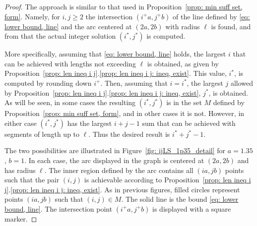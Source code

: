 \documentclass[12pt, a4paper]{article}
\newcommand{\len}{\ell} %
\newcommand{\isolr}{i^+}
\newcommand{\jsolr}{j^+}
\newcommand{\isoli}{i^\ast}
\newcommand{\jsoli}{j^\ast}
\newcommand{\mss}{M}
\begin{document}
\begin{proof}
The approach is similar to that used in Proposition~\ref{prop: min suff set, form}. Namely, for $i, j \geq 2$ the intersection $(\isolr a, \jsolr b)$ of the line defined by \eqref{eq: lower bound, line} and the arc centered at $(2a,2b)$ with radius $\len$ is found, and from that the actual integer solution $(\isoli, \jsoli)$ is computed.

More specifically, assuming that \eqref{eq: lower bound, line} holds, the largest $i$ that can be achieved with lengths not exceeding $\len$ is obtained, as given by Proposition~\ref{prop: len ineq i j}.\ref{prop: len ineq i j: ineq, exist}. This value, $\isoli$, is computed by rounding down $\isolr$. Then, assuming that $i = \isoli$, the largest $j$ allowed by Proposition~\ref{prop: len ineq i j}.\ref{prop: len ineq i j: ineq, exist}, $\jsoli$, is obtained. As will be seen, in some cases the resulting $(\isoli,\jsoli)$ is in the set $\mss$ defined by Proposition~\ref{prop: min suff set, form}, and in other cases it is not. However, in either case $(\isoli,\jsoli)$ has the largest $i+j-1$ sum that can be achieved with segments of length up to $\len$. Thus the desired result is $\isoli+\jsoli-1$.

The two possibilities are illustrated in Figure~\ref{fig: ijLS_1p35_detail} for $a=1.35$, $b=1$. In each case, the arc displayed in the graph is centered at $(2a,2b)$ and has radius $\len$. The inner region defined by the arc contains all $(ia,jb)$ points such that the pair $(i,j)$ is achievable according to Proposition~\ref{prop: len ineq i j}.\ref{prop: len ineq i j: ineq, exist}. As in previous figures, filled circles represent points $(ia,jb)$ such that $(i,j) \in \mss$. The solid line is the bound \eqref{eq: lower bound, line}. The intersection point $(\isolr a, \jsolr b)$ is displayed with a square marker.


\end{proof}
\end{document}
